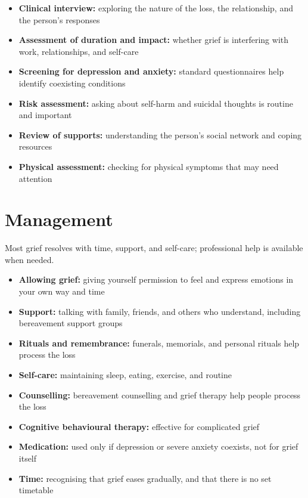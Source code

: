 \begin{itemize}
    \item \textbf{Clinical interview:} exploring the nature of the loss, the relationship, and the person's responses
    \item \textbf{Assessment of duration and impact:} whether grief is interfering with work, relationships, and self-care
    \item \textbf{Screening for depression and anxiety:} standard questionnaires help identify coexisting conditions
    \item \textbf{Risk assessment:} asking about self-harm and suicidal thoughts is routine and important
    \item \textbf{Review of supports:} understanding the person's social network and coping resources
    \item \textbf{Physical assessment:} checking for physical symptoms that may need attention
\end{itemize}

\section*{Management}
Most grief resolves with time, support, and self-care; professional help is available when needed.

\begin{itemize}
    \item \textbf{Allowing grief:} giving yourself permission to feel and express emotions in your own way and time
    \item \textbf{Support:} talking with family, friends, and others who understand, including bereavement support groups
    \item \textbf{Rituals and remembrance:} funerals, memorials, and personal rituals help process the loss
    \item \textbf{Self-care:} maintaining sleep, eating, exercise, and routine
    \item \textbf{Counselling:} bereavement counselling and grief therapy help people process the loss
    \item \textbf{Cognitive behavioural therapy:} effective for complicated grief
    \item \textbf{Medication:} used only if depression or severe anxiety coexists, not for grief itself
    \item \textbf{Time:} recognising that grief eases gradually, and that there is no set timetable
\end{itemize}

